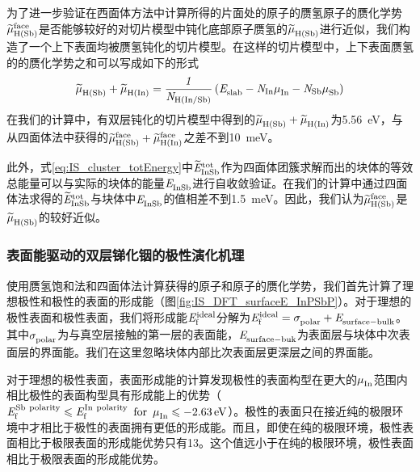 为了进一步验证在西面体方法中计算所得的片面处的原子的赝氢原子的赝化学势$\it \widetilde{\mu}_{\rm H\left(Sb\right)}^{\rm face} \it$是否能够较好的对切片模型中钝化底部原子赝氢的$\it \widetilde{\mu}_{\rm H\left(Sb\right)}^{\rm } \it$进行近似，我们构造了一个上下表面均被赝氢钝化的切片模型。在这样的切片模型中，上下表面赝氢的的赝化学势之和可以写成如下的形式\chinesecolon
\[
    \it \widetilde{\mu}_{\rm H\left(Sb\right)}^{\rm } \it+\it \widetilde{\mu}_{\rm H\left(In\right)}^{\rm } \it=\frac{1}{N_{\rm H \left(In/ Sb\right)}} \left(\it E_{\rm slab}^{\rm } \it-N_{\rm In}\it \mu_{\rm In}^{\rm } \it-N_{\rm Sb}\it \mu_{\rm Sb}^{\rm } \it\right)
    \]
在我们的计算中，有双层钝化的切片模型中得到的$\it \widetilde{\mu}_{\rm H\left(Sb\right)}^{\rm } \it+\it \widetilde{\mu}_{\rm H\left(In\right)}^{\rm } \it$为\SI{5.56}{\electronvolt}，与从四面体法中获得的$\it \widetilde{\mu}_{\rm H\left(Sb\right)}^{\rm face} \it+\it \widetilde{\mu}_{\rm H\left(In\right)}^{\rm face} \it$之差不到\SI{10}{\milli\electronvolt}。

此外，式\ref{eq:IS_cluster_totEnergy}中$\it \widetilde{E}_{\rm InSb}^{\rm tot} \it$作为四面体团簇求解而出的块体的等效总能量可以与实际的块体的能量$\it E_{\rm InSb}^{\rm } \it$进行自收敛验证。在我们的计算中通过四面体法求得的$\it \widetilde{E}_{\rm InSb}^{\rm tot} \it$与块体中$\it E_{\rm InSb}^{\rm } \it$的值相差不到\SI{1.5}{\milli\electronvolt}。因此，我们认为$\it \widetilde{\mu}_{\rm H\left(Sb\right)}^{\rm face} \it$是$\it \widetilde{\mu}_{\rm H\left(Sb\right)}^{\rm } \it$的较好近似。

\subsubsection{表面能驱动的双层锑化铟的极性演化机理}
使用赝氢饱和法和四面体法计算获得的原子和原子的赝化学势，我们首先计算了理想极性和极性的表面的形成能（图\ref{fig:IS_DFT_surfaceE_InPSbP}）。对于理想的极性表面和极性表面，我们将形成能$\it E_{\rm f}^{\rm ideal} \it$分解为$\it E_{\rm f}^{\rm ideal} \it=\it \sigma_{\rm polar}^{\rm } \it+\it E_{\rm surface-bulk}^{\rm } \it$。其中$\it \sigma_{\rm polar}^{\rm } \it$为与真空层接触的第一层的表面能，$\it E_{\rm surface-buk}^{\rm } \it$为表面层与块体中次表面层的界面能。我们在这里忽略块体内部比次表面层更深层之间的界面能。

对于理想的极性表面，表面形成能的计算发现极性的表面构型在更大的$\it \mu_{\rm In}^{\rm } \it$范围内相比极性的表面构型具有形成能上的优势（$\it E_{\rm f}^{\rm Sb\ polarity} \it \leqslant \it E_{\rm f}^{\rm In\ polarity} \it\enspace \rm{for} \enspace \it \mu_{\rm In}^{\rm } \it \leqslant \SI{-2.63}{\electronvolt}$）。极性的表面只在接近纯的极限环境中才相比于极性的表面拥有更低的形成能。而且，即使在纯的极限环境，极性表面相比于极限表面的形成能优势只有\SI{13}{\mievpas}。这个值远小于在纯的极限环境，极性表面相比于极限表面的形成能优势。

